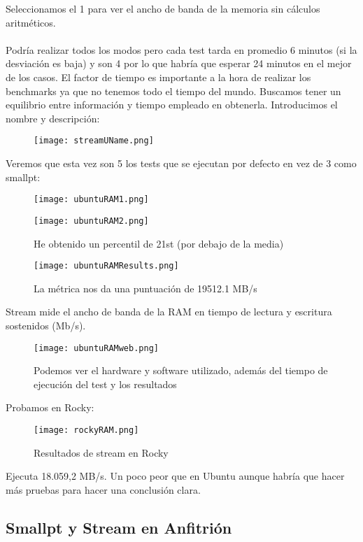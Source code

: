 Seleccionamos el 1 para ver el ancho de banda de la memoria sin cálculos aritméticos. 
\\\\
Podría realizar todos los modos pero cada test tarda en promedio 6 minutos (si la desviación es baja) y son 4 por lo que habría que esperar 24 minutos en el mejor de los casos. El factor de tiempo es importante a la hora de realizar los benchmarks ya que no tenemos todo el tiempo del mundo. Buscamos tener un equilibrio entre información y tiempo empleado en obtenerla. Introducimos el nombre y descripción:
\begin{figure}[H]
	\centering
	\texttt{[image: streamUName.png]}
\end{figure}

Veremos que esta vez son 5 los tests que se ejecutan por defecto en vez de 3 como smallpt:
\begin{figure}[H]
	\centering
	\texttt{[image: ubuntuRAM1.png]}
\end{figure}
\begin{figure}[H]
	\centering
	\texttt{[image: ubuntuRAM2.png]}
	\caption{He obtenido un percentil de 21st (por debajo de la media)}
\end{figure}

\begin{figure}[H]
	\centering
	\texttt{[image: ubuntuRAMResults.png]}
	\caption{La métrica nos da una puntuación de 19512.1 MB/s \cite{ubuntuStream}}
\end{figure}

Stream mide el ancho de banda de la RAM en tiempo de lectura y escritura sostenidos (Mb/s).

\begin{figure}[H]
	\centering
	\texttt{[image: ubuntuRAMweb.png]}
	\caption{Podemos ver el hardware y software utilizado, además del tiempo de ejecución del test y los resultados}
\end{figure}

\newpage

Probamos en Rocky:
\begin{figure}[H]
	\centering
	\texttt{[image: rockyRAM.png]}
	\caption{Resultados de stream en Rocky}
\end{figure}
Ejecuta 18.059,2 MB/s. Un poco peor que en Ubuntu aunque habría que hacer más pruebas para hacer una conclusión clara.

\subsection{Smallpt y Stream en Anfitrión}

